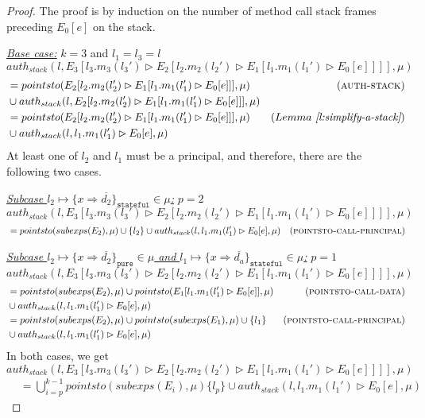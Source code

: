 \documentclass{llncs}
\newcommand{\keywadj}[1]{\mathtt{#1}}
\begin{document}
\begin{proof} The proof is by induction on the number of method call stack frames preceding $E_0[e]$ on the stack.

\noindent\underline{\textit{Base case:}} $k = 3$ and $l_1 = l_3 = l$\\
\noindent$auth_{stack}(l, E_3[l_3.m_3(l_3') \rhd E_2[l_2.m_2(l_2') \rhd E_1[l_1.m_1(l_1') \rhd E_0[e]]]], \mu)$
\vspace{-7pt}
\begin{align*}
&=  pointsto(E_2[l_2.m_2(l_2') \rhd E_1[l_1.m_1(l_1') \rhd E_0[e]]], \mu) & (\textsc{auth-stack})\\
&\cup auth_{stack}(l, E_2[l_2.m_2(l_2') \rhd E_1[l_1.m_1(l_1') \rhd E_0[e]]], \mu)\\
&=  pointsto(E_2[l_2.m_2(l_2') \rhd E_1[l_1.m_1(l_1') \rhd E_0[e]]], \mu) & (Lemma~\textit{\ref{l:simplify-a-stack}})\\
&\cup auth_{stack}(l, l_1.m_1(l_1') \rhd E_0[e], \mu)
\end{align*}
At least one of $l_2$ and $l_1$ must be a principal, and therefore, there are the following two cases.

\noindent\underline{\textit{Subcase $l_2 \mapsto \{ x \Rightarrow \overline{d_2} \}_{\keywadj{stateful}} \in \mu$:}} $p = 2$\\
\noindent$auth_{stack}(l, E_3[l_3.m_3(l_3') \rhd E_2[l_2.m_2(l_2') \rhd E_1[l_1.m_1(l_1') \rhd E_0[e]]]], \mu)$
\vspace{-7pt}
\begin{align*}
&=  pointsto(subexps(E_2), \mu) \cup \{ l_2 \} \cup auth_{stack}(l, l_1.m_1(l_1') \rhd E_0[e], \mu) & (\textsc{pointsto-call-principal})
\end{align*}

\noindent\underline{\textit{Subcase $l_2 \mapsto \{ x \Rightarrow \overline{d_2} \}_{\keywadj{pure}} \in \mu$ and $l_1 \mapsto \{ x \Rightarrow \overline{d_a} \}_{\keywadj{stateful}} \in \mu$:}} $p = 1$\\
\noindent$auth_{stack}(l, E_3[l_3.m_3(l_3') \rhd E_2[l_2.m_2(l_2') \rhd E_1[l_1.m_1(l_1') \rhd E_0[e]]]], \mu)$
\vspace{-7pt}
\begin{align*}
&=  pointsto(subexps(E_2), \mu) \cup pointsto(E_1[l_1.m_1(l_1') \rhd E_0[e]], \mu) & (\textsc{pointsto-call-data})\\
&\cup auth_{stack}(l, l_1.m_1(l_1') \rhd E_0[e], \mu)\\
&=  pointsto(subexps(E_2), \mu) \cup pointsto(subexps(E_1), \mu) \cup \{ l_1 \} & (\textsc{pointsto-call-principal})\\
&\cup auth_{stack}(l, l_1.m_1(l_1') \rhd E_0[e], \mu)
\end{align*}
In both cases, we get\\
\noindent$auth_{stack}(l, E_3[l_3.m_3(l_3') \rhd E_2[l_2.m_2(l_2') \rhd E_1[l_1.m_1(l_1') \rhd E_0[e]]]], \mu)$
\vspace{-7pt}
\begin{align*}
&= \bigcup^{k-1}_{i = p} pointsto(subexps(E_i), \mu) \{ l_p \} \cup auth_{stack}(l, l_1.m_1(l_1') \rhd E_0[e], \mu)
\end{align*}


\end{proof}
\end{document}

